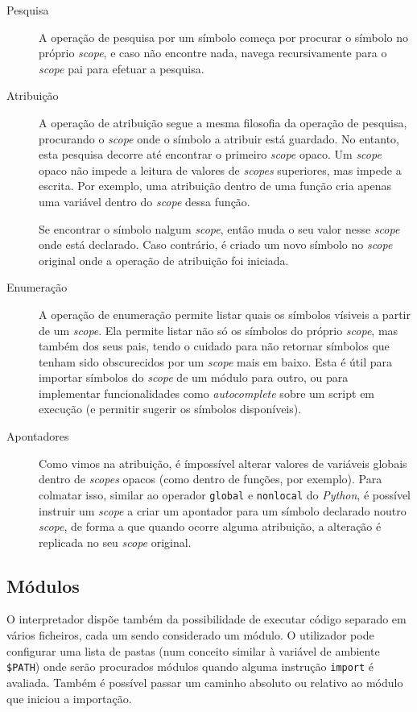 \begin{description}
 \item[Pesquisa] A operação de pesquisa por um símbolo começa por procurar o símbolo no próprio \textit{scope}, e caso não encontre nada, navega recursivamente para o \textit{scope} pai para efetuar a pesquisa.
 
 \item[Atribuição] A operação de atribuição segue a mesma filosofia da operação de pesquisa, procurando o \textit{scope} onde o símbolo a atribuir está guardado. No entanto, esta pesquisa decorre até encontrar o primeiro \textit{scope} opaco. Um \textit{scope} opaco não impede a leitura de valores de \textit{scopes} superiores, mas impede a escrita. Por exemplo, uma atribuição dentro de uma função cria apenas uma variável dentro do \textit{scope} dessa função.
 
 Se encontrar o símbolo nalgum \textit{scope}, então muda o seu valor nesse \textit{scope} onde está declarado. Caso contrário, é criado um novo símbolo no \textit{scope} original onde a operação de atribuição foi iniciada.
 
 \item[Enumeração] A operação de enumeração permite listar quais os símbolos vísiveis a partir de um \textit{scope}. Ela permite listar não só os símbolos do próprio \textit{scope}, mas também dos seus pais, tendo o cuidado para não retornar símbolos que tenham sido obscurecidos por um \textit{scope} mais em baixo. Esta é útil para importar símbolos do \textit{scope} de um módulo para outro, ou para implementar funcionalidades como \textit{autocomplete} sobre um script em execução (e permitir sugerir os símbolos disponíveis).
 
 \item[Apontadores] Como vimos na atribuição, é ímpossível alterar valores de variáveis globais dentro de \textit{scopes} opacos (como dentro de funções, por exemplo). Para colmatar isso, similar ao operador \texttt{global} e \texttt{nonlocal} do \textit{Python}, é possível instruir um \textit{scope} a criar um apontador para um símbolo declarado noutro \textit{scope}, de forma a que quando ocorre alguma atribuição, a alteração é replicada no seu \textit{scope} original.
\end{description}

\subsection{Módulos}
O interpretador dispõe também da possibilidade de executar código separado em vários ficheiros, cada um sendo considerado um módulo. O utilizador pode configurar uma lista de pastas (num conceito similar à variável de ambiente \texttt{\$PATH}) onde serão procurados módulos quando alguma instrução \texttt{import} é avaliada. Também é possível passar um caminho absoluto ou relativo ao módulo que iniciou a importação.

